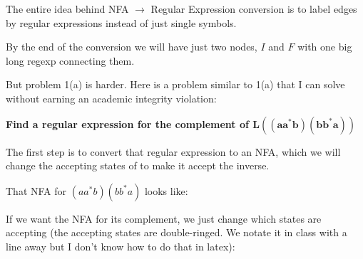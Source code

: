 \documentclass{report}
\begin{document}
    The entire idea behind NFA $\rightarrow$ Regular Expression conversion is to label edges by regular expressions instead of just single symbols.
    
    By the end of the conversion we will have just two nodes, $I$ and $F$ with one big long regexp connecting them.

    But problem 1(a) is harder. Here is a problem similar to 1(a) that I can solve without earning an academic integrity violation:

    \textbf{Find a regular expression for the complement of $\mathbf{L\left( (aa^* b) (bb^* a) \right)}$}

    The first step is to convert that regular expression to an NFA, which we will change the accepting states of to make it accept the inverse.

    That NFA for $(aa^* b) (bb^* a)$ looks like:

    \begin{figure}[H] %
        \centering %
        \caption*{}
        \label{fig:basicnfa}
    \end{figure}

    If we want the NFA for its complement, we just change which states are accepting (the accepting states are double-ringed. We notate it in class with a line away but I don't know how to do that in latex):
\end{document}

